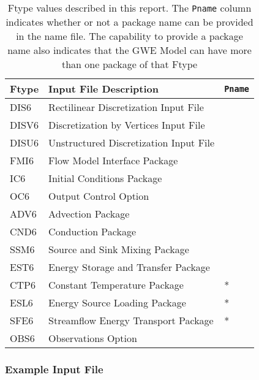 \begin{table}[H]
\caption{Ftype values described in this report.  The \texttt{Pname} column indicates whether or not a package name can be provided in the name file.  The capability to provide a package name also indicates that the GWE Model can have more than one package of that Ftype}
\small
\begin{center}
\begin{tabular*}{\columnwidth}{l l l}
\hline
\hline
Ftype & Input File Description & \texttt{Pname}\\
\hline
DIS6 & Rectilinear Discretization Input File \\
DISV6 & Discretization by Vertices Input File \\
DISU6 & Unstructured Discretization Input File \\
FMI6 & Flow Model Interface Package &  \\ 
IC6 & Initial Conditions Package \\
OC6 & Output Control Option \\
ADV6 & Advection Package \\ 
CND6 & Conduction Package \\ 
SSM6 & Source and Sink Mixing Package \\ 
EST6 & Energy Storage and Transfer Package \\
CTP6 & Constant Temperature Package & * \\ 
ESL6 & Energy Source Loading Package & * \\
SFE6 & Streamflow Energy Transport Package & * \\
OBS6 & Observations Option \\
\hline 
\end{tabular*}
\label{table:ftype}
\end{center}
\normalsize
\end{table}

\vspace{5mm}
\subsubsection{Example Input File}


